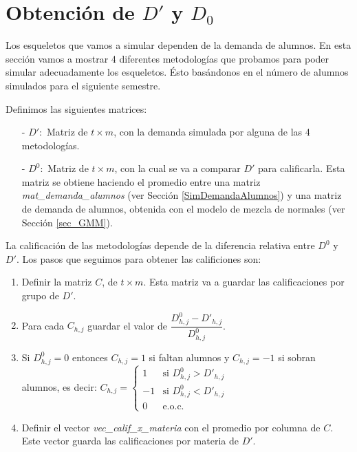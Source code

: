 \section{Obtención de $D'$ y $D_{0}$} \label{GMM_D}

Los esqueletos que vamos a simular dependen de la demanda de alumnos. En esta sección vamos a mostrar 4 diferentes metodologías que probamos para poder simular adecuadamente los esqueletos. Ésto basándonos en el número de alumnos simulados para el siguiente semestre. %


Definimos las siguientes matrices:

\begin{itemize}
\item[-] $D': $ Matriz de $t \times m$, con la demanda simulada por alguna de las 4 metodologías.

\item[-] $D^{0}: $ Matriz de $t \times m$, con la cual se va a comparar $D'$ para calificarla. Esta matriz se obtiene haciendo el promedio entre una matriz \textit{mat\_demanda\_alumnos} (ver Sección \ref{SimDemandaAlumnos}) y una matriz de demanda de alumnos, obtenida con el modelo de mezcla de normales (ver Sección \ref{sec_GMM}).
\end{itemize}

La calificación de las metodologías depende de la diferencia relativa entre $D^{0}$ y $D'$. Los pasos que seguimos para obtener las calificiones son:

\begin{enumerate}
\item Definir la matriz $C$, de $t \times m$. Esta matriz va a guardar las calificaciones por grupo de $D'$.

\item Para cada $C_{h,j}$ guardar el valor de $\dfrac{D_{h,j}^{0} - D'_{h,j}}{D_{h,j}^{0}}$. 

\item Si $D_{h,j}^{0} = 0$ entonces $C_{h,j} = 1$ si faltan alumnos y $C_{h,j} = -1$ si sobran alumnos, es decir: $C_{h,j} = \left \{ \begin{matrix} 1 & \mbox{si }D_{h,j}^{0} > D'_{h,j}\\ 
-1 & \mbox{si }D_{h,j}^{0} < D'_{h,j}\\ 0 & \mbox{e.o.c. }\end{matrix}\right.$



\item Definir el vector \textit{vec\_calif\_x\_materia} con el promedio por columna de $C$. Este vector guarda las calificaciones por materia de $D'$.
\end{enumerate}

